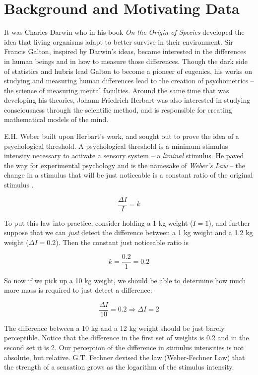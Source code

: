\documentclass[11pt, oneside]{book}
\begin{document}
\hypertarget{motivating-data}{%
\chapter{Background and Motivating Data}\label{motivating-data}}

It was Charles Darwin who in his book \emph{On the Origin of Species} developed the idea that living organisms adapt to better survive in their environment. Sir Francis Galton, inspired by Darwin's ideas, became interested in the differences in human beings and in how to measure those differences. Though the dark side of statistics and hubris lead Galton to become a pioneer of eugenics, his works on studying and measuring human differences lead to the creation of psychometrics -- the science of measuring mental faculties. Around the same time that was developing his theories, Johann Friedrich Herbart was also interested in studying consciousness through the scientific method, and is responsible for creating mathematical models of the mind.

E.H. Weber built upon Herbart's work, and sought out to prove the idea of a psychological threshold. A psychological threshold is a minimum stimulus intensity necessary to activate a sensory system -- a \emph{liminal} stimulus. He paved the way for experimental psychology and is the namesake of \emph{Weber's Law} -- the change in a stimulus that will be just noticeable is a constant ratio of the original stimulus \citep{britannica2014editors}.

\[
\frac{\Delta I}{I} = k
\]

To put this law into practice, consider holding a 1 kg weight (\(I = 1\)), and further suppose that we can \emph{just} detect the difference between a 1 kg weight and a 1.2 kg weight (\(\Delta I = 0.2\)). Then the constant just noticeable ratio is

\[
k = \frac{0.2}{1} = 0.2
\]

So now if we pick up a 10 kg weight, we should be able to determine how much more mass is required to just detect a difference:

\[
\frac{\Delta I}{10} = 0.2 \Rightarrow \Delta I = 2
\]

The difference between a 10 kg and a 12 kg weight should be just barely perceptible. Notice that the difference in the first set of weights is 0.2 and in the second set it is 2. Our perception of the difference in stimulus intensities is not absolute, but relative. G.T. Fechner devised the law (Weber-Fechner Law) that the strength of a sensation grows as the logarithm of the stimulus intensity.
\end{document}
